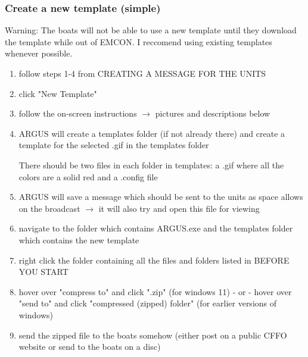 \subsubsection{Create a new template (simple)}
\begin{addwarn}
    Warning: The boats will not be able to use a new template until they download the template while out of EMCON. I reccomend using existing templates whenever possible.
\end{addwarn}
\begin{enumerate}
    \item follow steps 1-4 from CREATING A MESSAGE FOR THE UNITS
    \item click "New Template"
    \item follow the on-screen instructions $\rightarrow$ pictures and descriptions below
    \item ARGUS will create a templates folder (if not already there) and create a template for the selected .gif in the templates folder
    \begin{addnote} There should be two files in each folder in templates: a .gif where all the colors are a solid red and a .config file \end{addnote}
    \item ARGUS will save a message which should be sent to the units as space allows on the broadcast $\rightarrow$ it will also try and open this file for viewing
    \item navigate to the folder which contains ARGUS.exe and the templates folder which contains the new template
    \item right click the folder containing all the files and folders listed in BEFORE YOU START
    \item hover over "compress to" and click ".zip" (for windows 11) - or - hover over "send to" and click "compressed (zipped) folder" (for earlier versions of windows)
    \item send the zipped file to the boats somehow (either post on a public CFFO website or send to the boats on a disc)
\end{enumerate}



